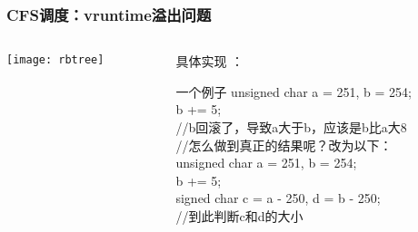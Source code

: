 \begin{frame}
	\frametitle{CFS调度：vruntime溢出问题}
	\begin{columns}
		\begin{column}{.4\textwidth}
			\Large \centering
			
			\texttt{[image: rbtree]}
		\end{column}
		
		\begin{column}{.6\textwidth}
			
			具体实现 ：
			
\begin{block}{一个例子}
unsigned char a = 251, b = 254;  \\
b += 5; \\
//b回滚了，导致a大于b，应该是b比a大8\\
 
//怎么做到真正的结果呢？改为以下：\\
unsigned char a = 251, b = 254;\\
b += 5; \\
signed char c = a - 250, d = b - 250; \\
//到此判断c和d的大小
\end{block}			

		\end{column}
	\end{columns}
\end{frame}

